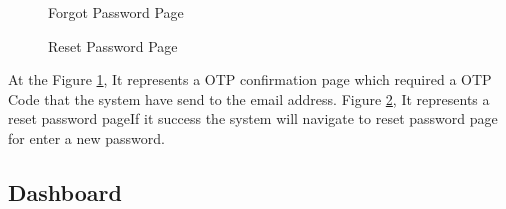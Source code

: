 \documentclass[12pt,oneside,openright,a4paper]{cpe-english-project}
\begin{document}
\begin{figure}[!h]
\centering
{}
\caption{Forgot Password Page}\label{fig:Forgot-Password-code}
\end{figure}

\begin{figure}[!h]
\centering
{}
\caption{Reset Password Page}\label{fig:Reset Password}
\end{figure}



At the Figure \ref{fig:Forgot-Password-code}, It represents a OTP confirmation page which required a OTP Code that the system have send to the email address. Figure \ref{fig:Reset Password}, It represents a reset password pageIf it success the system will navigate to reset password page for enter a new password.

\newpage
\subsection{Dashboard}
\end{document}
